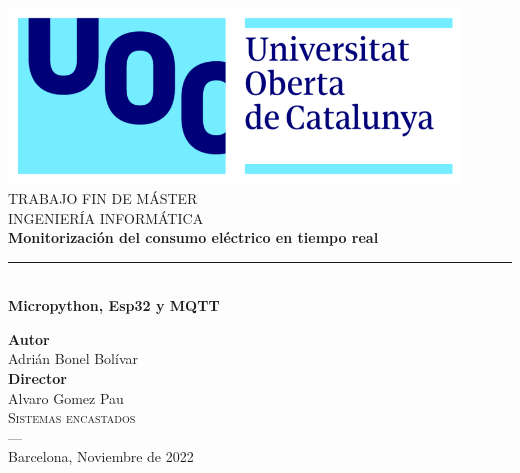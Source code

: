 \begin{titlepage}
 
\newlength{\centeroffset}
\setlength{\centeroffset}{-0.5\oddsidemargin}
\addtolength{\centeroffset}{0.5\evensidemargin}
\thispagestyle{empty}

\noindent\hspace*{\centeroffset}\begin{minipage}{\textwidth}

\centering
\includegraphics[width=0.9\textwidth]{imagenes/logo_uoc.png}\\[1.4cm]

\textsc{ \Large TRABAJO FIN DE MÁSTER\\[0.2cm]}
\textsc{ INGENIERÍA INFORMÁTICA}\\[1cm]
% 
{\Huge\bfseries Monitorización del consumo eléctrico en tiempo real\\
}
\noindent\rule[-1ex]{\textwidth}{3pt}\\[3.5ex]
{\large\bfseries Micropython, Esp32 y MQTT}
\end{minipage}

\vspace{2.5cm}
\noindent\hspace*{\centeroffset}\begin{minipage}{\textwidth}
\centering

\textbf{Autor}\\ {Adrián Bonel Bolívar}\\[2.5ex]
\textbf{Director}\\{Alvaro Gomez Pau}\\[2cm]
\textsc{Sistemas encastados}\\
\textsc{---}\\
Barcelona, Noviembre de 2022
\end{minipage}
\end{titlepage}


